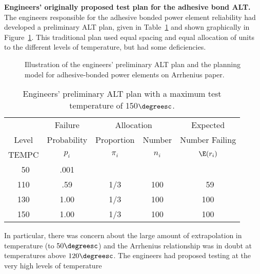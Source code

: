 \begin{example}
{\bf Engineers' originally proposed test plan 
for the adhesive bond ALT.}
\label{example:engineer.orig.plan}
The engineers responsible for the adhesive bonded power
element reliability had developed a preliminary ALT plan,
given in Table~\ref{table:alt.plan.eng.plan}
and shown graphically in Figure~\ref{figure:adh.bond.engineers.plan.ps}.
This traditional plan used equal spacing and equal allocation
of units to the different levels of
temperature, but had some deficiencies.
\begin{figure}
\caption{Illustration of the engineers' preliminary ALT  
plan and the planning model for adhesive-bonded power elements on
Arrhenius paper.}
\label{figure:adh.bond.engineers.plan.ps}
\end{figure}
\begin{table}
\caption{Engineers' preliminary ALT 
plan with a maximum test temperature of 150$\degreesc$.}
\centering\small
\begin{tabular}{ccccc}
\\[-.5ex]
\hline
& Failure & \multicolumn{2}{c}{Allocation} & Expected \\ \cline{3-4}
Level& Probability & Proportion & Number & Number Failing\\ TEMPC &
$p_{i}$ & $\pi_{i}$ &$n_{i}$ & $\E(r_{i})$ \\
\hline
\mbox{ 50}  & .001 &      &     &            \\
\mbox{110}  &  .59 & 1/3  & 100 & \mbox{ 59} \\
\mbox{130}  & 1.00 & 1/3  & 100 & \mbox{100} \\
\mbox{150}  & 1.00 & 1/3  & 100 & \mbox{100} \\
\hline
\end{tabular}
\begin{minipage}[t]{4.5in}
\end{minipage}
\label{table:alt.plan.eng.plan}
\end{table}
In particular, there was concern about the large amount of
extrapolation in temperature (to $50\degreesc$) and the Arrhenius
relationship was in doubt at temperatures above $120\degreesc$.  The
engineers had proposed testing at the very high levels of temperature

\end{example}
